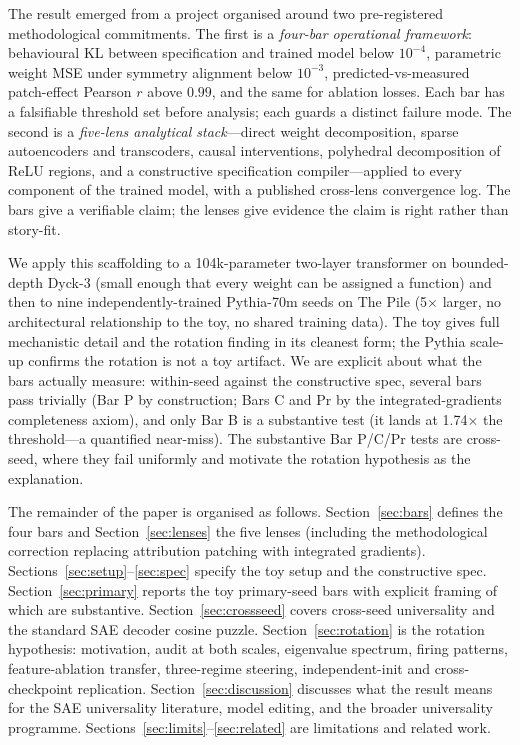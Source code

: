 \documentclass[11pt,letterpaper]{article}
\begin{document}
The result emerged from a project organised around two pre-registered methodological commitments. The first is a \emph{four-bar operational framework}: behavioural KL between specification and trained model below $10^{-4}$, parametric weight MSE under symmetry alignment below $10^{-3}$, predicted-vs-measured patch-effect Pearson $r$ above $0.99$, and the same for ablation losses. Each bar has a falsifiable threshold set before analysis; each guards a distinct failure mode. The second is a \emph{five-lens analytical stack}---direct weight decomposition, sparse autoencoders and transcoders, causal interventions, polyhedral decomposition of ReLU regions, and a constructive specification compiler---applied to every component of the trained model, with a published cross-lens convergence log. The bars give a verifiable claim; the lenses give evidence the claim is right rather than story-fit.

We apply this scaffolding to a 104k-parameter two-layer transformer on bounded-depth Dyck-3 (small enough that every weight can be assigned a function) and then to nine independently-trained Pythia-70m seeds \citep{biderman2023pythia} on The Pile \citep{gao2020pile} (5$\times$ larger, no architectural relationship to the toy, no shared training data). The toy gives full mechanistic detail and the rotation finding in its cleanest form; the Pythia scale-up confirms the rotation is not a toy artifact. We are explicit about what the bars actually measure: within-seed against the constructive spec, several bars pass trivially (Bar P by construction; Bars C and Pr by the integrated-gradients completeness axiom), and only Bar B is a substantive test (it lands at 1.74$\times$ the threshold---a quantified near-miss). The substantive Bar P/C/Pr tests are cross-seed, where they fail uniformly and motivate the rotation hypothesis as the explanation.

The remainder of the paper is organised as follows. Section~\ref{sec:bars} defines the four bars and Section~\ref{sec:lenses} the five lenses (including the methodological correction replacing attribution patching with integrated gradients). Sections~\ref{sec:setup}--\ref{sec:spec} specify the toy setup and the constructive spec. Section~\ref{sec:primary} reports the toy primary-seed bars with explicit framing of which are substantive. Section~\ref{sec:crossseed} covers cross-seed universality and the standard SAE decoder cosine puzzle. Section~\ref{sec:rotation} is the rotation hypothesis: motivation, audit at both scales, eigenvalue spectrum, firing patterns, feature-ablation transfer, three-regime steering, independent-init and cross-checkpoint replication. Section~\ref{sec:discussion} discusses what the result means for the SAE universality literature, model editing, and the broader universality programme. Sections~\ref{sec:limits}--\ref{sec:related} are limitations and related work.
\end{document}
